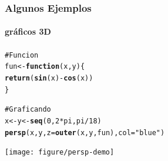 \documentclass{beamer}\usepackage{graphicx, color}
\makeatletter
\newcommand{\hlfunctioncall}[1]{\textcolor[rgb]{0.501960784313725,0,0.329411764705882}{\textbf{#1}}}%
\newcommand{\hlstring}[1]{\textcolor[rgb]{0.6,0.6,1}{#1}}%
\newcommand{\hlcomment}[1]{\textcolor[rgb]{0.180392156862745,0.6,0.341176470588235}{#1}}%
\newenvironment{kframe}{%
 \def\at@end@of@kframe{}%
 \ifinner\ifhmode%
  \def\at@end@of@kframe{\end{minipage}}%
  \begin{minipage}{\columnwidth}%
 \fi\fi%
 \def\FrameCommand##1{\hskip\@totalleftmargin \hskip-\fboxsep
 \colorbox{shadecolor}{##1}\hskip-\fboxsep
     \hskip-\linewidth \hskip-\@totalleftmargin \hskip\columnwidth}%
 \MakeFramed {\advance\hsize-\width
   \@totalleftmargin\z@ \linewidth\hsize
   \@setminipage}}%
 {\par\unskip\endMakeFramed%
 \at@end@of@kframe}
\newenvironment{knitrout}{}{} %
\makeatother
\begin{document}
\begin{frame}[fragile]
\frametitle{Algunos Ejemplos}
\framesubtitle{gr\'aficos 3D}
\begin{knitrout}\footnotesize
{}\color{fgcolor}\begin{kframe}
\begin{alltt}
\hlcomment{# Funcion}
fun <- \hlfunctioncall{function}(x, y) \{
    \hlfunctioncall{return}(\hlfunctioncall{sin}(x) - \hlfunctioncall{cos}(x))
\}

\hlcomment{# Graficando}
x <- y <- \hlfunctioncall{seq}(0, 2 * pi, pi/18)
\hlfunctioncall{persp}(x, y, z = \hlfunctioncall{outer}(x, y, fun), col = \hlstring{"blue"})
\end{alltt}
\end{kframe}
\texttt{[image: figure/persp-demo]} 

\end{knitrout}

\end{frame}

\def\title{Gracias!}
\end{document}

